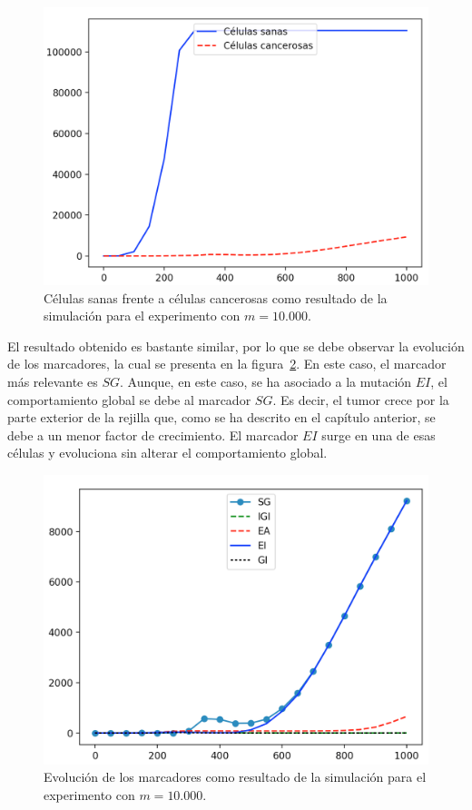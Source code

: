 \begin{figure}[h]
\centering
\includegraphics[scale=0.6]{figures/experiments/exp1/healthvscarcino}
\caption{Células sanas frente a células cancerosas como resultado de la simulación para el experimento con $m = 10.000$.}
\label{fig:ownexp1-1}
\end{figure}

El resultado obtenido es bastante similar, por lo que se debe observar la evolución de los
marcadores, la cual se presenta en la figura~\ref{fig:ownexp1-2}. En este caso, el marcador
más relevante es $SG$. Aunque, en este caso, se ha asociado a la mutación $EI$, el comportamiento
global se debe al marcador $SG$. Es decir, el tumor crece por la parte exterior de la rejilla que,
como se ha descrito en el capítulo anterior, se debe a un menor factor de crecimiento. El marcador
$EI$ surge en una de esas células y evoluciona sin alterar el comportamiento global.

\begin{figure}[h]
\centering
\includegraphics[scale=0.6]{figures/experiments/exp1/mutations}
\caption{Evolución de los marcadores como resultado de la simulación para el experimento con $m = 10.000$.}
\label{fig:ownexp1-2}
\end{figure}

